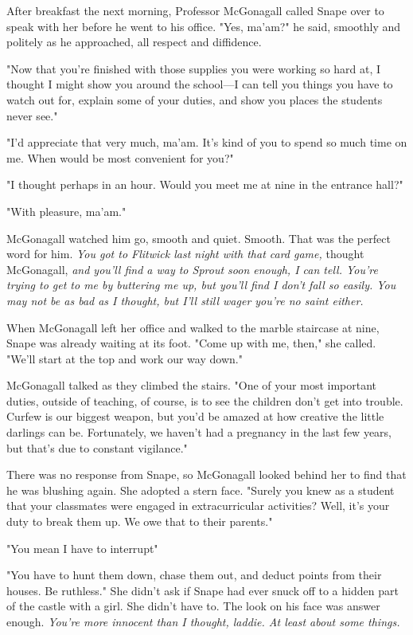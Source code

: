 After breakfast the next morning, Professor McGonagall called Snape over to speak with her before he went to his office. "Yes, ma'am?" he said, smoothly and politely as he approached, all respect and diffidence.

"Now that you're finished with those supplies you were working so hard at, I thought I might show you around the school—I can tell you things you have to watch out for, explain some of your duties, and show you places the students never see."

"I'd appreciate that very much, ma'am. It's kind of you to spend so much time on me. When would be most convenient for you?"

"I thought perhaps in an hour. Would you meet me at nine in the entrance hall?"

"With pleasure, ma'am."

McGonagall watched him go, smooth and quiet. Smooth. That was the perfect word for him. \emph{You got to Flitwick last night with that card game,} thought McGonagall, \emph{and you'll find a way to Sprout soon enough, I can tell. You're trying to get to me by buttering me up, but you'll find I don't fall so easily. You may not be as bad as I thought, but I'll still wager you're no saint either.}

When McGonagall left her office and walked to the marble staircase at nine, Snape was already waiting at its foot. "Come up with me, then," she called. "We'll start at the top and work our way down."

McGonagall talked as they climbed the stairs. "One of your most important duties, outside of teaching, of course, is to see the children don't get into trouble. Curfew is our biggest weapon, but you'd be amazed at how creative the little darlings can be. Fortunately, we haven't had a pregnancy in the last few years, but that's due to constant vigilance."

There was no response from Snape, so McGonagall looked behind her to find that he was blushing again. She adopted a stern face. "Surely you knew as a student that your classmates were engaged in extracurricular activities? Well, it's your duty to break them up. We owe that to their parents."

"You mean I have to interrupt{\el}"

"You have to hunt them down, chase them out, and deduct points from their houses. Be ruthless." She didn't ask if Snape had ever snuck off to a hidden part of the castle with a girl. She didn't have to. The look on his face was answer enough. \emph{You're more innocent than I thought, laddie. At least about some things.}

